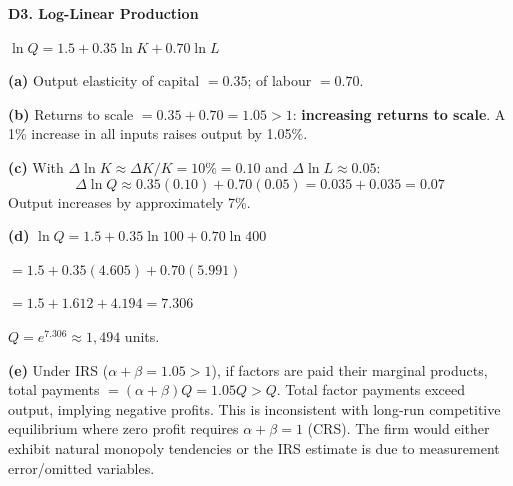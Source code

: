 \documentclass[12pt, a4paper]{article}
\theoremstyle{definition}
\begin{document}
\begin{solbox}
\textbf{D3. Log-Linear Production}

$\ln Q = 1.5 + 0.35\ln K + 0.70\ln L$

\textbf{(a)} Output elasticity of capital $= 0.35$; of labour $= 0.70$.

\textbf{(b)} Returns to scale $= 0.35 + 0.70 = 1.05 > 1$: \textbf{increasing returns to scale}. A 1\% increase in all inputs raises output by 1.05\%.

\textbf{(c)} With $\Delta\ln K\approx\Delta K/K=10\%=0.10$ and $\Delta\ln L\approx 0.05$:
\[
  \Delta\ln Q \approx 0.35(0.10)+0.70(0.05) = 0.035+0.035 = 0.07
\]
Output increases by approximately 7\%.

\textbf{(d)} $\ln Q = 1.5+0.35\ln 100+0.70\ln 400$

$= 1.5+0.35(4.605)+0.70(5.991)$

$= 1.5+1.612+4.194 = 7.306$

$Q = e^{7.306} \approx 1{,}494$ units.

\textbf{(e)} Under IRS ($\alpha+\beta=1.05>1$), if factors are paid their marginal products, total payments $= (\alpha+\beta)Q = 1.05Q > Q$. Total factor payments exceed output, implying negative profits. This is inconsistent with long-run competitive equilibrium where zero profit requires $\alpha+\beta=1$ (CRS). The firm would either exhibit natural monopoly tendencies or the IRS estimate is due to measurement error/omitted variables.
\end{solbox}
\end{document}
